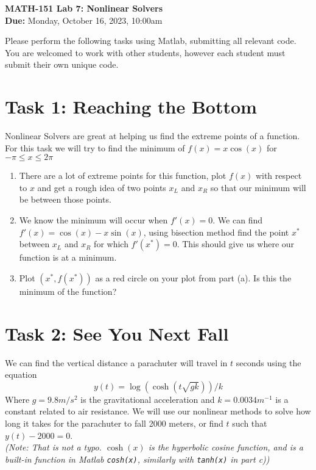 \documentclass[11pt]{article}
\begin{document}
	
	\begin{center}
		\Large{\textbf{MATH-151 Lab 7: Nonlinear Solvers}}\\
			\medskip
		\normalsize{\textbf{Due:} Monday, October 16, 2023, 10:00am} 
	\end{center}
	\noindent\makebox[\linewidth]{\rule{\textwidth}{0.4pt}}
	Please perform the following tasks using Matlab, submitting all relevant code. You are welcomed to work with other students, however each student must submit their own unique code.
	
	\section*{Task 1: Reaching the Bottom}
	\noindent Nonlinear Solvers are great at helping us find the extreme points of a function. For this task we will try to find the minimum of $f(x) = x\cos(x)$ for $-\pi \le x\le 2\pi$
	\begin{enumerate}[label=\alph*)]
		\item There are a lot of extreme points for this function, plot $f(x)$ with respect to $x$ and get a rough idea of two points $x_L$ and $x_R$ so that our minimum will be between those points.
		\item We know the minimum will occur when $f'(x) = 0$. We can find $f'(x) = \cos(x) - x\sin(x)$, using bisection method find the point $x^*$ between $x_L$ and $x_R$ for which $f'(x^*) = 0$. This should give us where our function is at a minimum.
		\item Plot $(x^*, f(x^*))$ as a red circle on your plot from part (a). Is this the minimum of the function?
	\end{enumerate}
	
	\section*{Task 2: See You Next Fall}
	\noindent We can find the vertical distance a parachuter will travel in $t$ seconds using the equation
	\begin{equation*}
		y(t) = \log(\cosh(t\sqrt{gk}))/k
	\end{equation*}
	Where $g=9.8m/s^2$ is the gravitational acceleration and $k=0.0034m^{-1}$ is a constant related to air resistance. We will use our nonlinear methods to solve how long it takes for the parachuter to fall 2000 meters, or find $t$ such that $y(t)-2000 = 0$.\\
	\textit{(Note: That is not a typo. $\cosh(x)$ is the hyperbolic cosine function, and is a built-in function in Matlab \texttt{cosh(x)}, similarly with \texttt{tanh(x)} in part c))}
	
\end{document}
